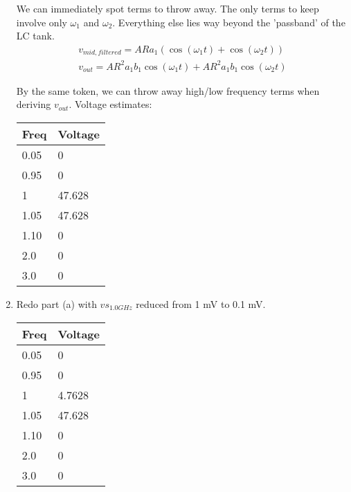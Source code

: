 \begin{enumerate}[label=(\alph*)]
    We can immediately spot terms to throw away. The only terms to keep involve only $\omega_1$ and $\omega_2$. Everything else
        lies way beyond the 'passband' of the LC tank.
    \begin{align*}
        v_{mid,filtered} = A R a_{1} (\cos{\left (\omega_1 t \right )} + \cos{\left (\omega_2 t \right )}) \\
        v_{out} = A R^{2} a_{1} b_{1} \cos{\left (\omega_1 t \right )} + A R^{2} a_{1} b_{1} \cos{\left (\omega_2 t \right )}
    \end{align*}

    By the same token, we can throw away high/low frequency terms when deriving $v_{out}$. Voltage estimates:

    \begin{center}
    \begin{tabular}{| l | l |} \hline
        Freq & Voltage \\ \hline
        0.05 & 0 \\ \hline
        0.95 & 0 \\ \hline
        1 & 47.628 \\ \hline
        1.05 & 47.628 \\ \hline
        1.10 & 0 \\ \hline
        2.0 & 0 \\ \hline
        3.0 & 0 \\ \hline
    \end{tabular}
    \end{center}

    \item {\color{blue} Redo part (a) with $vs_{1.0GHz}$ reduced from 1 mV to 0.1 mV.}
    \begin{center}
    \begin{tabular}{| l | l |} \hline
        Freq & Voltage \\ \hline
        0.05 & 0 \\ \hline
        0.95 & 0 \\ \hline
        1 & 4.7628 \\ \hline
        1.05 & 47.628 \\ \hline
        1.10 & 0 \\ \hline
        2.0 & 0 \\ \hline
        3.0 & 0 \\ \hline
    \end{tabular}
    \end{center}
\end{enumerate}


